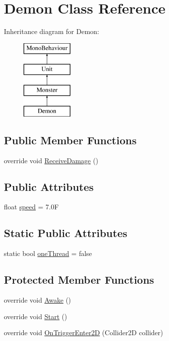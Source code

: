 \hypertarget{class_demon}{}\section{Demon Class Reference}
\label{class_demon}
Inheritance diagram for Demon\+:\begin{figure}[H]
\begin{center}
\leavevmode
\includegraphics[height=4.000000cm]{class_demon}
\end{center}
\end{figure}
\subsection*{Public Member Functions}
\begin{DoxyCompactItemize}
\item 
override void \mbox{\hyperlink{class_demon_a90dc4738a3cab182e3daa2da35cbbbc6}{Receive\+Damage}} ()
\end{DoxyCompactItemize}
\subsection*{Public Attributes}
\begin{DoxyCompactItemize}
\item 
float \mbox{\hyperlink{class_demon_aa70173ebd268fdf60a979f64d3c8a2aa}{speed}} = 7.\+0F
\end{DoxyCompactItemize}
\subsection*{Static Public Attributes}
\begin{DoxyCompactItemize}
\item 
static bool \mbox{\hyperlink{class_demon_a89b29e16599d3d03485366ac8f29678d}{one\+Thread}} = false
\end{DoxyCompactItemize}
\subsection*{Protected Member Functions}
\begin{DoxyCompactItemize}
\item 
override void \mbox{\hyperlink{class_demon_a1a87c40897c33f1a752e66807fb53f34}{Awake}} ()
\item 
override void \mbox{\hyperlink{class_demon_ae40d3b2d791569cd6517117aa19335b3}{Start}} ()
\item 
override void \mbox{\hyperlink{class_demon_aa0c85beffd46a97daa76e65bb2388444}{On\+Trigger\+Enter2D}} (Collider2D collider)
\end{DoxyCompactItemize}


